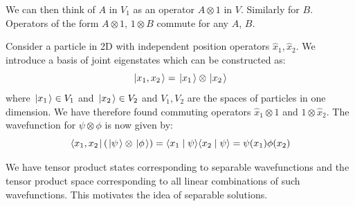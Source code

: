 \documentclass[../Main.tex]{subfiles}
\begin{document}
We can then think of $A$ in $V_1$ as an operator $A \otimes 1$ in $V$. Similarly for $B$. Operators of the form $A \otimes 1$, $1 \otimes B$ commute for any $A$, $B$.
\begin{example}
    Consider a particle in 2D with independent position operators $\hat{x}_1, \hat{x}_2$. We introduce a basis of joint eigenstates which can be constructed as:
    \begin{equation*}
        \left.\left|x_1, x_2\right.\right\rangle = \left.\left|x_1\right.\right\rangle \otimes \left.\left|x_2\right.\right\rangle
    \end{equation*}
    where $\left.\left|x_1\right.\right\rangle \in V_1$ and $\left.\left|x_2\right.\right\rangle \in V_2$ and $V_1, V_2$ are the spaces of particles in one dimension. We have therefore found commuting operators $\hat{x}_1 \otimes 1$ and $1 \otimes \hat{x}_2$. The wavefunction for $\psi \otimes \phi$ is now given by:
    \begin{equation*}
        \left.\left\langle x_1, x_2\right.\right|\left(\left.\left|\psi\right.\right\rangle \otimes \left.\left|\phi\right.\right\rangle\right) = \langle x_1\mid\psi\rangle \langle x_2\mid\psi\rangle = \psi(x_1) \phi(x_2)
    \end{equation*}
\end{example}
We have tensor product states corresponding to separable wavefunctions and the tensor product space corresponding to all linear combinations of such wavefunctions. This motivates the idea of separable solutions.
\end{document}
